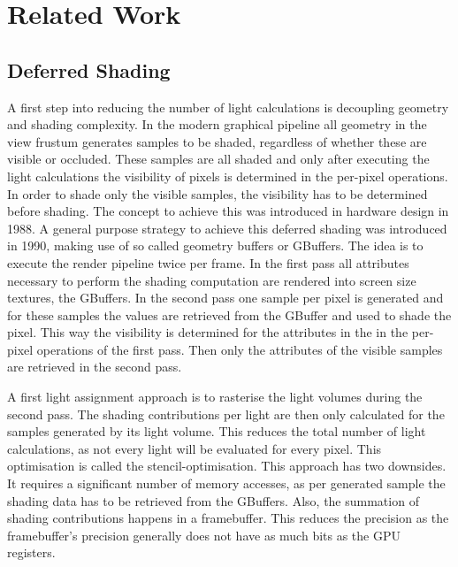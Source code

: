 \section{Related Work}

\subsection{Deferred Shading}

A first step into reducing the number of light calculations is decoupling
geometry and shading complexity. In the modern graphical pipeline all geometry
in the view frustum generates samples to be shaded, regardless of whether these
are visible or occluded. These samples are all shaded and only after executing
the light calculations the visibility of pixels is determined in the per-pixel
operations. In order to shade only the visible samples, the visibility has to be
determined before shading. The concept to achieve this was introduced in hardware
design in 1988\cite{deering1988triangle}. A general purpose strategy to achieve
this deferred shading was introduced in 1990, making use of so called
geometry buffers or GBuffers\cite{saito1990comprehensible}. The idea
is to execute the render pipeline twice per frame. In the first pass all
attributes necessary to perform the shading computation are rendered into screen
size textures, the GBuffers. In the second pass one sample per pixel is generated and
for these samples the values are retrieved from the GBuffer and used to shade
the pixel. This way the visibility is determined for the attributes in the in
the per-pixel operations of the first pass. Then only the attributes of the
visible samples are retrieved in the second pass.

A first light assignment approach is to rasterise the light volumes during the
second pass. The shading contributions per light are then only calculated for
the samples generated by its light volume. This reduces the total number
of light calculations, as not every light will be evaluated for every pixel.
This optimisation is called the stencil-optimisation\cite{doi:10.1080/10867651.2003.10487587}.
This approach has two downsides. It requires a significant number of memory
accesses, as per generated sample the shading data has to be retrieved from the
GBuffers. Also, the summation of shading contributions happens in a framebuffer.
This reduces the precision as the framebuffer's precision generally does not
have as much bits as the GPU registers.

